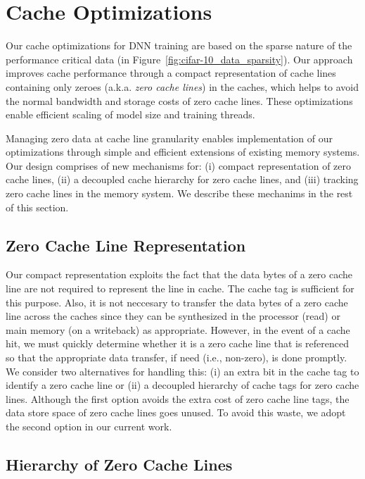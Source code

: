 \section{Cache Optimizations}
\label{sec:cache_opt}

Our cache optimizations for DNN training are based on the sparse nature of the performance critical data (in Figure~\ref{fig:cifar-10_data_sparsity}).  Our approach improves cache performance through a compact representation of cache lines containing only zeroes (a.k.a. \emph{zero cache lines}) in the caches, which helps to avoid  the normal bandwidth and storage costs of zero cache lines. These optimizations enable efficient scaling of model size and training threads.  

Managing zero data at cache line granularity enables implementation of our optimizations through simple and efficient extensions of existing memory systems.  Our design comprises of new mechanisms for: (i) compact representation of zero cache lines, (ii) a decoupled cache hierarchy for zero cache lines, and (iii) tracking zero cache lines in the memory system.  We describe these mechanims in the rest of this section.

\subsection{Zero Cache Line Representation}

Our compact representation exploits the fact that the data bytes of a zero cache line are not required to represent the line in cache.  The cache tag is sufficient for this purpose. Also, it is not neccesary to transfer the data bytes of a zero cache line across the caches since they can be synthesized in the processor (read) or main memory (on a writeback) as appropriate.  However, in the event of a cache hit, we must quickly determine whether it is a zero cache line that is referenced so that the appropriate data transfer, if need (i.e., non-zero),  is done promptly. We consider two alternatives for handling this: (i) an extra bit in the cache tag to identify a zero cache line or (ii) a decoupled hierarchy of cache tags for zero cache lines.  Although the first option avoids the extra cost of zero cache line tags, the data store space of zero cache lines goes unused.  To avoid this waste, we adopt the second option in our current work. 

\subsection{Hierarchy of Zero Cache Lines}

